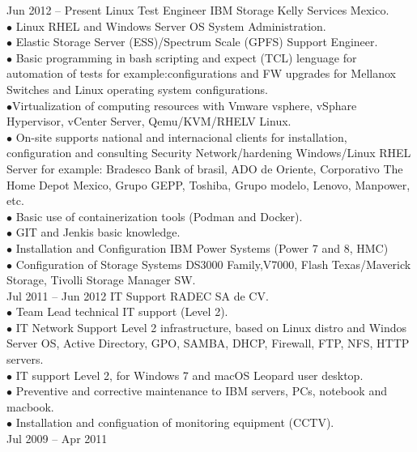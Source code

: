 \documentclass[9pt]{developercv} %
\begin{document}

\begin{entrylist}
	\entry
		{Jun 2012 -- Present}
		{Linux Test Engineer IBM Storage}
		{Kelly Services Mexico.}
			{{}\\$\bullet$ Linux RHEL and Windows Server OS System Administration.
				\\$\bullet$ Elastic Storage Server (ESS)/Spectrum Scale (GPFS) Support Engineer.
					\\$\bullet$ Basic programming in bash scripting and expect (TCL) lenguage for automation of tests for example:configurations and FW upgrades for Mellanox Switches and Linux operating system configurations.						
				\\$\bullet$Virtualization of computing resources with Vmware vsphere, vSphare Hypervisor, vCenter Server, Qemu/KVM/RHELV Linux.
				\\$\bullet$ On-site supports national and internacional clients for installation, configuration and consulting Security Network/hardening Windows/Linux RHEL Server for example:
				Bradesco Bank of brasil, ADO de Oriente, Corporativo The Home Depot Mexico, Grupo GEPP, Toshiba, Grupo modelo, Lenovo, Manpower,
				etc.
				\\$\bullet$ Basic use of containerization tools (Podman and Docker).			
				\\$\bullet$ GIT and Jenkis basic knowledge.
				\\$\bullet$ Installation and Configuration IBM Power Systems (Power 7 and 8, HMC)\\$\bullet$ Configuration of Storage Systems DS3000 Family,V7000, Flash Texas/Maverick Storage, Tivolli Storage Manager SW.\\}
	\entry
	{Jul 2011 -- Jun 2012}
	{IT Support}
	{RADEC SA de CV.}
	{{} \\$\bullet$ Team Lead technical IT support (Level 2). 
		\\$\bullet$ IT Network Support Level 2 infrastructure, based
		on Linux distro and Windos Server OS, Active Directory, GPO, SAMBA, DHCP, Firewall, FTP,
		NFS, HTTP servers.
		\\$\bullet$ IT support Level 2, for Windows 7 and macOS Leopard user desktop.
		\\$\bullet$ Preventive and corrective maintenance to IBM servers, PCs, notebook and macbook.\\$\bullet$ Installation and configuation of monitoring equipment (CCTV).\\}
	\entry
	{Jul 2009 -- Apr 2011}

\end{entrylist}
\end{document}
